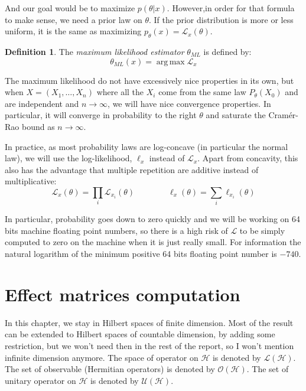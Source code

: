 \documentclass[10pt,a4paper]{report}
\theoremstyle{plain}
\theoremstyle{definition}
\newtheorem{defn}{Definition}[chapter]
\theoremstyle{remark}
\DeclareMathOperator{\argmax}{arg\,max}
\newcommand{\ml}{_{M\!L}}
\begin{document}
And our goal would be to maximize $p(\theta|x)$. However,in order for that
formula to make sense, we need a prior law on $\theta$. If the prior
distribution is more or less uniform, it is the same as maximizing $p_\theta(x)
= \mathcal{L}_x(\theta)$.


\begin{defn}
  The \emph{maximum likelihood estimator} $\theta\ml$ is defined by:
  \[\theta\ml(x) = \argmax \mathcal{L}_x\]
\end{defn}

The maximum likelihood do not have excessively nice properties in its own, but
when $X = (X_1,\ldots,X_n)$ where all the $X_i$ come from the same law
$P_\theta(X_0)$ and are independent and $n \to \infty$,
we will have nice convergence properties. In particular, it will converge in
probability to the right
$\theta$ and saturate the Cramér-Rao bound as $n \to \infty$.
\

In practice, as most probability laws are log-concave (in particular the normal
law), we will use the log-likelihood, $\ell_x$ instead of $\mathcal{L}_x$. Apart
from concavity, this also has the advantage that multiple repetition are
additive instead of multiplicative:
\[\mathcal{L}_x(\theta) = \prod_i \mathcal{L}_{x_i}(\theta) \quad \quad \quad
  \quad \ell_x(\theta) = \sum_i \ell_{x_i}(\theta)\]

In particular, probability goes down to zero quickly and we will be working on
64 bits machine floating point numbers, so there is a high risk of $\mathcal{L}$ to
be simply computed to zero on the machine when it is just really small. For
information the natural logarithm of the minimum positive 64 bits floating point number
is $-740$.





\chapter{Effect matrices computation}

In this chapter, we stay in Hilbert spaces of finite dimension. Most of the
result can be extended to Hilbert spaces of countable dimension, by adding
some restriction,
but we won't need then in the rest of the report, so I won't mention infinite
dimension anymore. The space of operator on
$\mathcal{H}$ is denoted by $\mathcal{L}(\mathcal{H})$. The set of observable
(Hermitian operators) is denoted by $\mathcal{O}(\mathcal{H})$. The set of
unitary operator on $\mathcal{H}$ is denoted by $\mathcal{U}(\mathcal{H})$.
\end{document}
